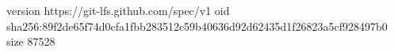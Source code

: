 version https://git-lfs.github.com/spec/v1
oid sha256:89f2de65f74d0cfa1fbb283512c59b40636d92d62435d1f26823a5cf928497b0
size 87528
